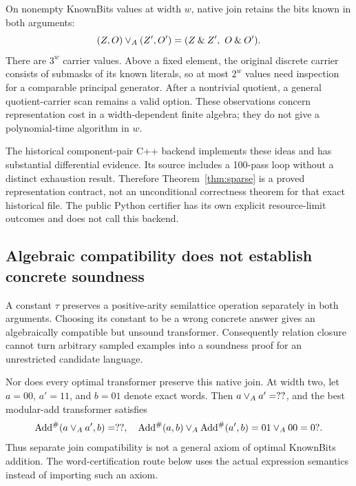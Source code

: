 On nonempty KnownBits values at width $w$, native join retains the bits known in both arguments:
\[
(Z,O)\join(Z',O')=(Z\mathbin{\&}Z',\ O\mathbin{\&}O').
\]
There are $3^w$ carrier values. Above a fixed element, the original discrete carrier consists of submasks of its known literals, so at most $2^w$ values need inspection for a comparable principal generator. After a nontrivial quotient, a general quotient-carrier scan remains a valid option. These observations concern representation cost in a width-dependent finite algebra; they do not give a polynomial-time algorithm in $w$.

The historical component-pair C++ backend implements these ideas and has substantial differential evidence. Its source includes a 100-pass loop without a distinct exhaustion result. Therefore Theorem~\ref{thm:sparse} is a proved representation contract, not an unconditional correctness theorem for that exact historical file. The public Python certifier has its own explicit resource-limit outcomes and does not call this backend.

\subsection{Algebraic compatibility does not establish concrete soundness}
A constant $\tau$ preserves a positive-arity semilattice operation separately in both arguments. Choosing its constant to be a wrong concrete answer gives an algebraically compatible but unsound transformer. Consequently relation closure cannot turn arbitrary sampled examples into a soundness proof for an unrestricted candidate language.

Nor does every optimal transformer preserve this native join. At width two, let $a=00$, $a'=11$, and $b=01$ denote exact words. Then $a\vee_A a'=??$, and the best modular-add transformer satisfies
\[
\operatorname{Add}^{\#}(a\vee_A a',b)=??,
\quad
\operatorname{Add}^{\#}(a,b)\vee_A\operatorname{Add}^{\#}(a',b)=01\vee_A00=0?.
\]
Thus separate join compatibility is not a general axiom of optimal KnownBits addition. The word-certification route below uses the actual expression semantics instead of importing such an axiom.
